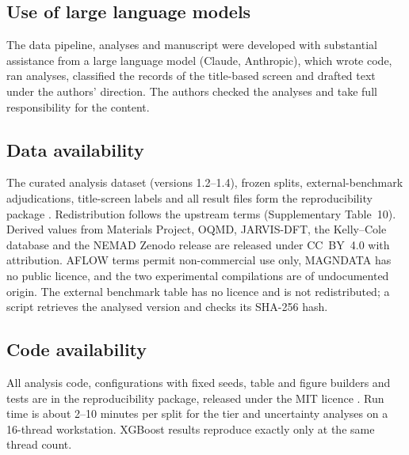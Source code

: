 \documentclass[11pt,a4paper]{article}
\begin{document}
\subsection*{Use of large language models}
The data pipeline, analyses and manuscript were developed with substantial assistance from a large language model (Claude, Anthropic), which wrote code, ran analyses, classified the records of the title-based screen and drafted text under the authors' direction. The authors checked the analyses and take full responsibility for the content. 

\subsection*{Data availability}
The curated analysis dataset (versions 1.2--1.4), frozen splits, external-benchmark adjudications, title-screen labels and all result files form the reproducibility package . Redistribution follows the upstream terms (Supplementary Table~10). Derived values from Materials Project, OQMD, JARVIS-DFT, the Kelly--Cole database and the NEMAD Zenodo release are released under CC~BY~4.0 with attribution. AFLOW terms permit non-commercial use only, MAGNDATA has no public licence, and the two experimental compilations are of undocumented origin. The external benchmark table has no licence and is not redistributed; a script retrieves the analysed version and checks its SHA-256 hash. 

\subsection*{Code availability}
All analysis code, configurations with fixed seeds, table and figure builders and tests are in the reproducibility package, released under the MIT licence . Run time is about 2--10 minutes per split for the tier and uncertainty analyses on a 16-thread workstation. XGBoost results reproduce exactly only at the same thread count.

{\singlespacing

}
\end{document}
